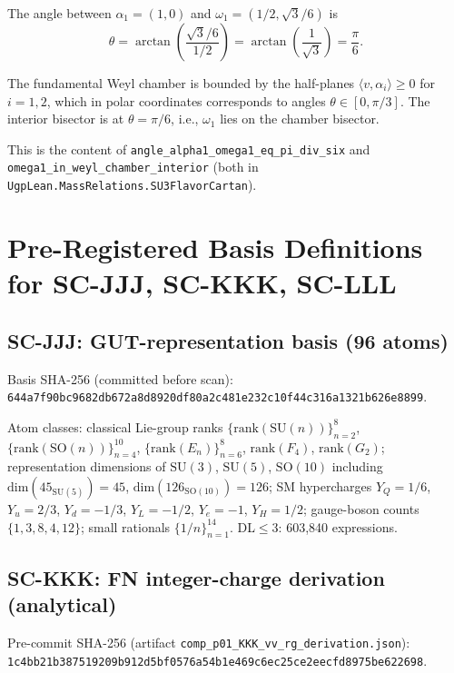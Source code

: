 \documentclass[11pt]{article}
\theoremstyle{remark}
\newcommand{\lean}[1]{\texttt{\small#1}}
\newcommand{\paren}[1]{\left(#1\right)}
\begin{document}
The angle between $\alpha_1=(1,0)$ and $\omega_1=(1/2,\sqrt{3}/6)$ is
\[
  \theta = \arctan\!\paren{\frac{\sqrt{3}/6}{1/2}} = \arctan\!\paren{\frac{1}{\sqrt{3}}} = \frac{\pi}{6}.
\]

The fundamental Weyl chamber is bounded by the half-planes
$\langle v, \alpha_i\rangle \geq 0$ for $i=1,2$, which in polar coordinates
corresponds to angles $\theta\in[0,\pi/3]$.  The interior bisector is at
$\theta = \pi/6$, i.e., $\omega_1$ lies on the chamber bisector.

This is the content of \lean{angle\_alpha1\_omega1\_eq\_pi\_div\_six}
and \lean{omega1\_in\_weyl\_chamber\_interior}
(both in \lean{UgpLean.MassRelations.SU3FlavorCartan}).

\section{Pre-Registered Basis Definitions for SC-JJJ, SC-KKK, SC-LLL}
\label{app:basis}

\subsection*{SC-JJJ: GUT-representation basis (96 atoms)}

Basis SHA-256 (committed before scan):\\
\texttt{644a7f90bc9682db672a8d8920df80a2c481e232c10f44c316a1321b626e8899}.

Atom classes: classical Lie-group ranks $\{\mathrm{rank}(\mathrm{SU}(n))\}_{n=2}^{8}$,
$\{\mathrm{rank}(\mathrm{SO}(n))\}_{n=4}^{10}$,
$\{\mathrm{rank}(E_n)\}_{n=6}^{8}$,
$\mathrm{rank}(F_4)$, $\mathrm{rank}(G_2)$;
representation dimensions of $\mathrm{SU}(3)$, $\mathrm{SU}(5)$, $\mathrm{SO}(10)$
including $\mathrm{dim}(45_{\mathrm{SU}(5)})=45$,
$\mathrm{dim}(126_{\mathrm{SO}(10)})=126$;
SM hypercharges $Y_Q=1/6$, $Y_u=2/3$, $Y_d=-1/3$,
$Y_L=-1/2$, $Y_e=-1$, $Y_H=1/2$;
gauge-boson counts $\{1, 3, 8, 4, 12\}$; small rationals $\{1/n\}_{n=1}^{14}$.
DL$\leq3$: 603{,}840 expressions.

\subsection*{SC-KKK: FN integer-charge derivation (analytical)}

Pre-commit SHA-256 (artifact \texttt{comp\_p01\_KKK\_vv\_rg\_derivation.json}):\\
\texttt{1c4bb21b387519209b912d5bf0576a54}\allowbreak\texttt{b1e469c6ec25ce2eecfd8975be622698}.
\end{document}
